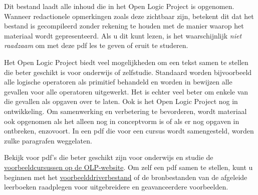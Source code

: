 \documentclass[../include/open-logic-part]{subfiles}
\begin{document}
\clearpage

\begin{editorial}
Dit bestand laadt alle inhoud die in het Open Logic Project is opgenomen.
Wanneer redactionele opmerkingen zoals deze zichtbaar zijn, betekent dit dat
het bestand is gecompileerd zonder rekening te houden met de manier waarop het
materiaal wordt gepresenteerd. Als u dit kunt lezen, is het waarschijnlijk
\emph{niet raadzaam} om met deze pdf les te geven of eruit te studeren.

Het Open Logic Project biedt veel mogelijkheden om een tekst samen te
stellen die beter geschikt is voor onderwijs of zelfstudie. Standaard worden
bijvoorbeeld alle logische operatoren als primitief behandeld en worden in
bewijzen alle gevallen voor alle operatoren uitgewerkt. Het is echter veel beter
om enkele van die gevallen als opgaven over te laten. Ook is het Open Logic
Project nog in ontwikkeling. Om samenwerking en verbetering te bevorderen,
wordt materiaal ook opgenomen als het alleen nog in conceptvorm is of als er nog
opgaven in ontbreken, enzovoort. In een pdf die voor een cursus wordt
samengesteld, worden zulke paragrafen weggelaten.

Bekijk voor pdf's die beter geschikt zijn voor onderwijs en studie de
\href{http://builds.openlogicproject.org/}{voorbeeldcursussen op de
  OLP-website}. Om zelf een pdf samen te stellen, kunt u beginnen met het
\href{https://github.com/OpenLogicProject/OpenLogic/tree/master/courses/sample}{voorbeelddriverbestand}
of de bronbestanden van de afgeleide leerboeken raadplegen
voor uitgebreidere en geavanceerdere voorbeelden.
\end{editorial}


















\end{document}
